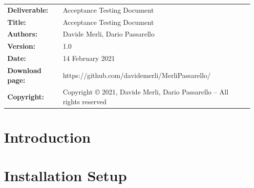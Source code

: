 \begin{table}[h!]
  \begin{tabu} to \textwidth { X[0.4,r,p] X[0.7,l,p] }
    \hline

    \textbf{Deliverable:}   & Acceptance Testing Document                                                \\
    \textbf{Title:}         & Acceptance Testing Document                                                \\
    \textbf{Authors:}       & Davide Merli, Dario Passarello                                         \\
    \textbf{Version:}       & 1.0                                                                    \\
    \textbf{Date:}          & 14 February 2021                                                       \\
    \textbf{Download page:} & https://github.com/davidemerli/MerliPassarello/                        \\
    \textbf{Copyright:}     & Copyright © 2021, Davide Merli, Dario Passarello – All rights reserved \\
    \hline
  \end{tabu}
\end{table}




\setcounter{page}{2}


\newpage
{}
\tableofcontents
\newpage
{}
\listoffigures

\clearpage
\section{Introduction}
\label{sect:introduction}


\clearpage
\section{Installation Setup}
\label{sect:installation_setup}


